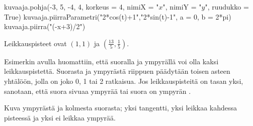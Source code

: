 \begin{esimerkki}
\begin{esimratk}
\begin{kuva}
    kuvaaja.pohja(-3, 5, -4, 4, korkeus = 4, nimiX = "$x$", nimiY = "$y$", ruudukko = True)
    kuvaaja.piirraParametri("2*cos(t)+1","2*sin(t)-1", a = 0, b = 2*pi)
    kuvaaja.piirra("(-x+3)/2")
	
\end{kuva}
\begin{esimvast}
Leikkauspisteet ovat $(1, 1)$ ja $(\frac{13}{5}, \frac{1}{5})$.
\end{esimvast}

\end{esimratk}
\end{esimerkki}

Esimerkin avulla huomattiin, että suoralla ja ympyrällä voi olla kaksi leikkauspistettä. Suorasta ja ympyrästä riippuen päädytään toisen asteen yhtälöön, jolla on joko 0, 1 tai 2 ratkaisua. Jos leikkauspisteitä on tasan yksi, sanotaan, että suora sivuaa ympyrää tai suora on ympyrän .

Kuva ympyrästä ja kolmesta suorasta; yksi tangentti, yksi leikkaa kahdessa pisteessä ja yksi ei leikkaa ympyrää.


